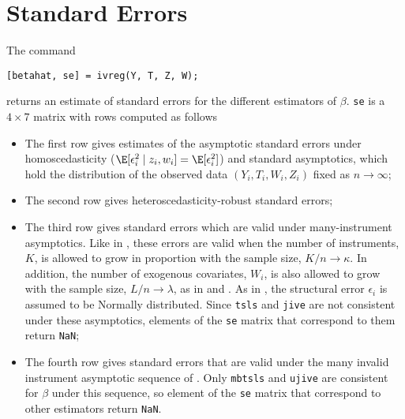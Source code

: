 \documentclass{mynotes}
\begin{document}
\section{Standard Errors}
The command
\begin{lstlisting}
[betahat, se] = ivreg(Y, T, Z, W);
\end{lstlisting}
returns an estimate of standard errors for the different estimators of $\beta$.
\lstinline!se! is a $4\times 7$ matrix with rows computed as follows
\begin{itemize}
\item The first row gives estimates of the asymptotic standard errors under
  homoscedasticity ($\E[\epsilon_{i}^{2}\mid z_{i},w_{i}]=\E[\epsilon_{i}^{2}]$)
  and standard asymptotics, which hold the distribution of the observed data
  $(Y_{i},T_{i},W_{i},Z_{i})$ fixed as $n\to \infty$;
\item The second row gives heteroscedasticity-robust standard errors;
\item The third row gives standard errors which are valid under many-instrument
  asymptotics. Like in \citet{bekker94}, these errors are valid when the number
  of instruments, $K$, is allowed to grow in proportion with the sample size,
  $K/n\to \kappa$. In addition, the number of exogenous covariates, $W_{i}$, is
  also allowed to grow with the sample size, $L/n\to \lambda$, as in
  \citet{anatolyev11} and \citet{cfhssy11}. As in \citet{bekker94}, the
  structural error $\epsilon_{i}$ is assumed to be Normally distributed. Since
  \texttt{tsls} and \texttt{jive} are not consistent under these asymptotics,
  elements of the \lstinline!se! matrix that correspond to them return
  \lstinline!NaN!;
\item The fourth row gives standard errors that are valid under the many invalid
  instrument asymptotic sequence of \citet{kcfgi11}. Only \texttt{mbtsls} and
  \texttt{ujive} are consistent for $\beta$ under this sequence, so element of
  the \lstinline!se! matrix that correspond to other estimators return
  \lstinline!NaN!.
\end{itemize}
\end{document}
